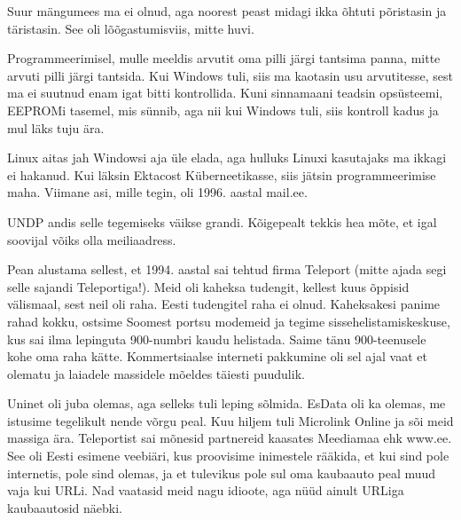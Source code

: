 
Suur mängumees ma ei olnud, aga noorest peast midagi ikka õhtuti põristasin 
ja täristasin. See oli lõõgastumisviis, mitte huvi. 


Programmeerimisel, mulle meeldis arvutit oma pilli järgi tantsima panna, mitte 
arvuti pilli järgi tantsida. Kui Windows tuli, 
siis ma kaotasin usu arvutitesse, sest ma ei suutnud enam igat 
bitti kontrollida. Kuni sinnamaani teadsin opsüsteemi, EEPROMi 
tasemel, mis sünnib, aga nii kui Windows tuli, siis kontroll kadus ja mul läks tuju ära.


Linux aitas jah Windowsi aja üle elada, aga hulluks 
Linuxi kasutajaks ma ikkagi ei hakanud. Kui läksin 
Ektacost Küberneetikasse, siis jätsin programmeerimise maha. Viimane asi, mille 
tegin, oli 1996. aastal mail.ee. 


UNDP andis selle tegemiseks väikse grandi.
Kõigepealt tekkis hea mõte, et igal soovijal võiks olla meiliaadress. 

Pean alustama sellest, et 1994. aastal sai tehtud 
firma Teleport (mitte ajada segi selle sajandi 
Teleportiga!). Meid oli kaheksa tudengit, kellest kuus õppisid välismaal, sest 
neil oli raha. Eesti tudengitel raha ei olnud. Kaheksakesi panime rahad 
kokku, ostsime Soomest portsu modemeid ja tegime sissehelistamiskeskuse, kus 
sai ilma lepinguta 900-numbri kaudu helistada. Saime 
tänu 900-teenusele kohe oma raha kätte. Kommertsiaalse interneti pakkumine oli sel 
ajal vaat et olematu ja laiadele massidele mõeldes täiesti 
puudulik. 


Uninet oli juba olemas, aga selleks tuli leping sõlmida. 
EsData oli ka olemas, me istusime tegelikult nende võrgu peal. 
Kuu hiljem tuli Microlink Online ja sõi meid massiga 
ära. Teleportist sai mõnesid partnereid kaasates 
Meediamaa ehk www.ee. See oli Eesti 
esimene veebiäri, kus proovisime inimestele rääkida, et kui sind pole 
internetis, pole sind olemas, ja et tulevikus pole sul oma kaubaauto peal muud vaja kui URLi. Nad vaatasid meid nagu idioote, aga nüüd ainult URLiga 
kaubaautosid näebki. 

